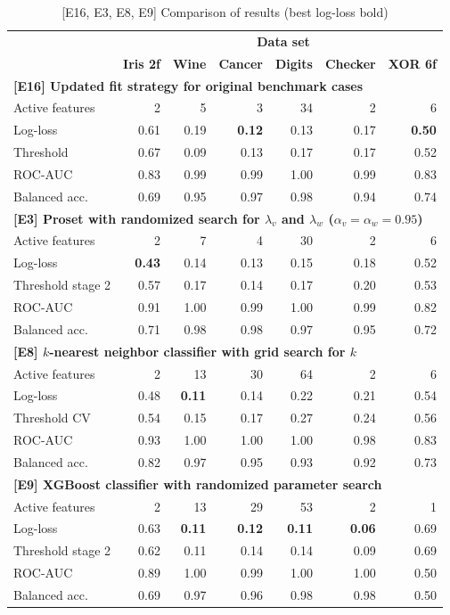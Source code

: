 \begin{table}
\caption{[E16, E3, E8, E9] Comparison of results (best log-loss bold)}
\label{tab_e16_e3_e8, e9}
%
\begin{center}
\small
\begin{tabular}{|lrrrrrr|}
\hline
&\multicolumn{6}{c|}{\textbf{\hrulefill\ Data set \hrulefill}}\\
&\textbf{Iris 2f}&\textbf{Wine}&\textbf{Cancer}&\textbf{Digits}&\textbf{Checker}&\textbf{XOR 6f}\\
\multicolumn{7}{|l|}{\textbf{[E16] Updated fit strategy for original benchmark cases}}\\
Active features&2&5&3&34&2&6\\
Log-loss&0.61&0.19&\textbf{0.12}&0.13&0.17&\textbf{0.50}\\
Threshold&0.67&0.09&0.13&0.17&0.17&0.52\\
ROC-AUC&0.83&0.99&0.99&1.00&0.99&0.83\\
Balanced acc.&0.69&0.95&0.97&0.98&0.94&0.74\\
\multicolumn{7}{|l|}{\textbf{[E3] Proset with randomized search for $\lambda_v$ and $\lambda_w$ ($\alpha_v=\alpha_w=0.95$)}}\\
Active features&2&7&4&30&2&6\\
Log-loss&\textbf{0.43}&0.14&0.13&0.15&0.18&0.52\\
Threshold stage 2&0.57&0.17&0.14&0.17&0.20&0.53\\
ROC-AUC&0.91&1.00&0.99&1.00&0.99&0.82\\
Balanced acc.&0.71&0.98&0.98&0.97&0.95&0.72\\
\multicolumn{7}{|l|}{\textbf{[E8] $k$-nearest neighbor classifier with grid search for $k$}}\\
Active features&2&13&30&64&2&6\\
Log-loss&0.48&\textbf{0.11}&0.14&0.22&0.21&0.54\\
Threshold CV&0.54&0.15&0.17&0.27&0.24&0.56\\
ROC-AUC&0.93&1.00&1.00&1.00&0.98&0.83\\
Balanced acc.&0.82&0.97&0.95&0.93&0.92&0.73\\
\multicolumn{7}{|l|}{\textbf{[E9] XGBoost classifier with randomized parameter search}}\\
Active features&2&13&29&53&2&1\\
Log-loss&0.63&\textbf{0.11}&\textbf{0.12}&\textbf{0.11}&\textbf{0.06}&0.69\\
Threshold stage 2&0.62&0.11&0.14&0.14&0.09&0.69\\
ROC-AUC&0.89&1.00&0.99&1.00&1.00&0.50\\
Balanced acc.&0.69&0.97&0.96&0.98&0.98&0.50\\
\hline
\end{tabular}
\end{center}
\end{table}
